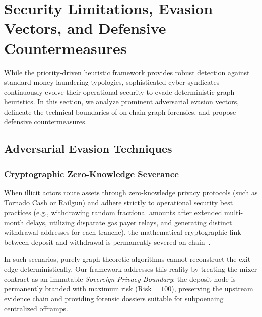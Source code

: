 \section{Security Limitations, Evasion Vectors, and Defensive Countermeasures}
\label{sec:limitations}

While the priority-driven heuristic framework provides robust detection against standard money laundering typologies, sophisticated cyber syndicates continuously evolve their operational security to evade deterministic graph heuristics. In this section, we analyze prominent adversarial evasion vectors, delineate the technical boundaries of on-chain graph forensics, and propose defensive countermeasures.

\subsection{Adversarial Evasion Techniques}

\subsubsection{Cryptographic Zero-Knowledge Severance}
When illicit actors route assets through zero-knowledge privacy protocols (such as Tornado Cash or Railgun) and adhere strictly to operational security best practices (e.g., withdrawing random fractional amounts after extended multi-month delays, utilizing disparate gas payer relays, and generating distinct withdrawal addresses for each tranche), the mathematical cryptographic link between deposit and withdrawal is permanently severed on-chain~\cite{pertsev2020tornado, ghesmati2022deanonymizing}. 

In such scenarios, purely graph-theoretic algorithms cannot reconstruct the exit edge deterministically. Our framework addresses this reality by treating the mixer contract as an immutable \emph{Sovereign Privacy Boundary}: the deposit node is permanently branded with maximum risk ($\text{Risk} = 100$), preserving the upstream evidence chain and providing forensic dossiers suitable for subpoenaing centralized offramps.

